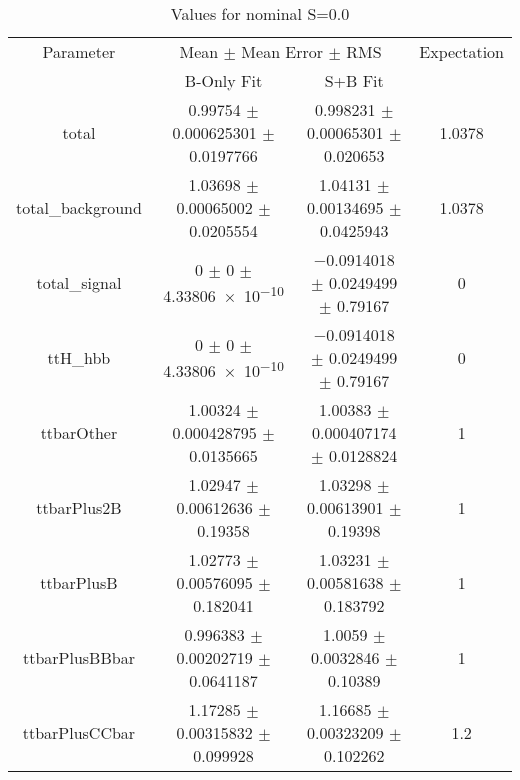 \begin{table}
\centering
\caption{Values for nominal S=0.0}
\begin{tabular}{cccc}
\toprule
Parameter & \multicolumn{2}{c}{Mean $\pm$ Mean Error $\pm$ RMS} & Expectation\\
 & B-Only Fit & S+B Fit & \\
\midrule
total & \num{0.99754} $\pm$ \num{0.000625301} $\pm$ \num{0.0197766} & \num{0.998231} $\pm$ \num{0.00065301} $\pm$ \num{0.020653} & \num{1.0378}\\
total\_background & \num{1.03698} $\pm$ \num{0.00065002} $\pm$ \num{0.0205554} & \num{1.04131} $\pm$ \num{0.00134695} $\pm$ \num{0.0425943} & \num{1.0378}\\
total\_signal & \num{0} $\pm$ \num{0} $\pm$ \num{4.33806e-10} & \num{-0.0914018} $\pm$ \num{0.0249499} $\pm$ \num{0.79167} & \num{0}\\
ttH\_hbb & \num{0} $\pm$ \num{0} $\pm$ \num{4.33806e-10} & \num{-0.0914018} $\pm$ \num{0.0249499} $\pm$ \num{0.79167} & \num{0}\\
ttbarOther & \num{1.00324} $\pm$ \num{0.000428795} $\pm$ \num{0.0135665} & \num{1.00383} $\pm$ \num{0.000407174} $\pm$ \num{0.0128824} & \num{1}\\
ttbarPlus2B & \num{1.02947} $\pm$ \num{0.00612636} $\pm$ \num{0.19358} & \num{1.03298} $\pm$ \num{0.00613901} $\pm$ \num{0.19398} & \num{1}\\
ttbarPlusB & \num{1.02773} $\pm$ \num{0.00576095} $\pm$ \num{0.182041} & \num{1.03231} $\pm$ \num{0.00581638} $\pm$ \num{0.183792} & \num{1}\\
ttbarPlusBBbar & \num{0.996383} $\pm$ \num{0.00202719} $\pm$ \num{0.0641187} & \num{1.0059} $\pm$ \num{0.0032846} $\pm$ \num{0.10389} & \num{1}\\
ttbarPlusCCbar & \num{1.17285} $\pm$ \num{0.00315832} $\pm$ \num{0.099928} & \num{1.16685} $\pm$ \num{0.00323209} $\pm$ \num{0.102262} & \num{1.2}\\
\bottomrule
\end{tabular}
\end{table}